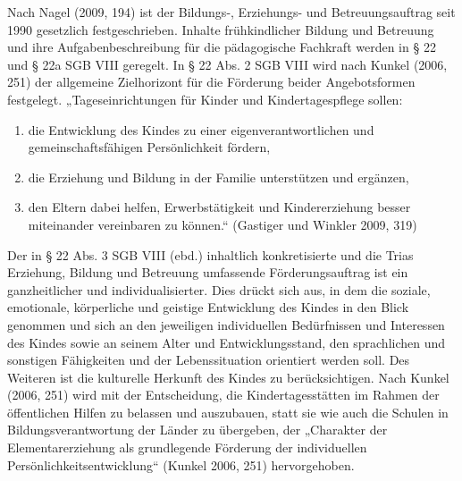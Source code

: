 Nach Nagel (2009, 194) ist der Bildungs-, Erziehungs- und Betreuungsauftrag seit 1990 gesetzlich festgeschrieben. Inhalte frühkindlicher Bildung und Betreuung und ihre Aufgabenbeschreibung für die pädagogische Fachkraft werden in § 22 und § 22a SGB VIII geregelt. 
In § 22 Abs. 2 SGB VIII wird nach Kunkel (2006, 251) der allgemeine Zielhorizont für die Förderung beider Angebotsformen festgelegt. 
„Tageseinrichtungen für Kinder und Kindertagespflege sollen:

\begin{enumerate}
\item die Entwicklung des Kindes zu einer eigenverantwortlichen und gemeinschaftsfähigen Persönlichkeit fördern,
\item die Erziehung und Bildung in der Familie unterstützen und ergänzen,
\item den Eltern dabei helfen, Erwerbstätigkeit und Kindererziehung besser miteinander vereinbaren zu können.“ (Gastiger und Winkler 2009, 319)  
\end{enumerate}

Der in § 22 Abs. 3 SGB VIII (ebd.) inhaltlich konkretisierte und die Trias Erziehung, Bildung und Betreuung umfassende Förderungsauftrag ist ein ganzheitlicher und individualisierter. Dies drückt sich aus, in dem die soziale, emotionale, körperliche und geistige Entwicklung des Kindes in den Blick genommen und sich an den jeweiligen individuellen Bedürfnissen und Interessen des Kindes sowie an seinem Alter und Entwicklungsstand, den sprachlichen und sonstigen Fähigkeiten und der Lebenssituation orientiert werden soll. Des Weiteren ist die kulturelle Herkunft des Kindes zu berücksichtigen. Nach Kunkel (2006, 251) wird mit der Entscheidung, die Kindertagesstätten im Rahmen der öffentlichen Hilfen zu belassen und auszubauen, statt sie wie auch die Schulen in Bildungsverantwortung der Länder zu übergeben, der „Charakter der Elementarerziehung als grundlegende Förderung der individuellen Persönlichkeitsentwicklung“ (Kunkel 2006, 251) hervorgehoben. 

